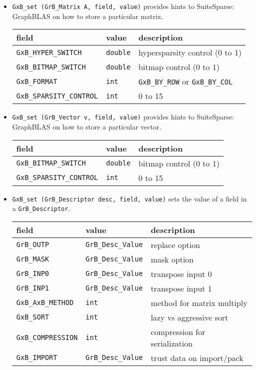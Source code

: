 \documentclass[12pt]{article}
\begin{document}
\begin{itemize}
\item \verb'GxB_set (GrB_Matrix A, field, value)' provides hints to
    SuiteSparse: GraphBLAS on how to store a particular matrix.

{\footnotesize
\begin{tabular}{lll}
field                       & value         & description \\
\hline
\verb'GxB_HYPER_SWITCH'     & \verb'double' & hypersparsity control (0 to 1) \\
\verb'GxB_BITMAP_SWITCH'    & \verb'double' & bitmap control (0 to 1) \\
\verb'GxB_FORMAT'           & \verb'int'    & \verb'GxB_BY_ROW'
                                              or \verb'GxB_BY_COL' \\
\verb'GxB_SPARSITY_CONTROL' & \verb'int'    & 0 to 15 \\
\hline
\end{tabular}
}

\item \verb'GxB_set (GrB_Vector v, field, value)' provides hints to
    SuiteSparse: GraphBLAS on how to store a particular vector.

{\footnotesize
\begin{tabular}{lll}
field                       & value         & description \\
\hline
\verb'GxB_BITMAP_SWITCH'    & \verb'double' & bitmap control (0 to 1) \\
\verb'GxB_SPARSITY_CONTROL' & \verb'int'    & 0 to 15 \\
\hline
\end{tabular}
}

\item \verb'GxB_set (GrB_Descriptor desc, field, value)' sets
    the value of a field in a \verb'GrB_Descriptor'.

{\footnotesize
\begin{tabular}{lll}
field                       & value         & description \\
\hline
\verb'GrB_OUTP'     & \verb'GrB_Desc_Value' & replace option \\
\verb'GrB_MASK'     & \verb'GrB_Desc_Value' & mask option \\
\verb'GrB_INP0'     & \verb'GrB_Desc_Value' & transpose input 0 \\
\verb'GrB_INP1'     & \verb'GrB_Desc_Value' & transpose input 1 \\
\verb'GxB_AxB_METHOD'           & \verb'int' & method for matrix multiply \\
\verb'GxB_SORT'                 & \verb'int' & lazy vs aggressive sort \\
\verb'GxB_COMPRESSION'          & \verb'int' & compression for serialization \\
\verb'GxB_IMPORT'    & \verb'GrB_Desc_Value' & trust data on import/pack \\
\hline
\end{tabular}
}


\end{itemize}
\end{document}
